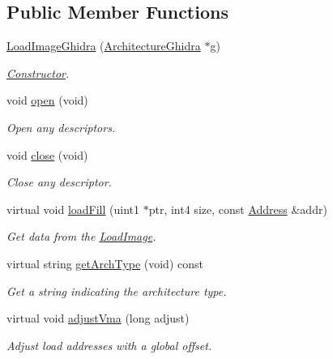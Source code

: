 \subsection*{Public Member Functions}
\begin{DoxyCompactItemize}
\item 
\mbox{\hyperlink{class_load_image_ghidra_aedafdb4dafc0b5cc60d1f3f28776e6a0}{Load\+Image\+Ghidra}} (\mbox{\hyperlink{class_architecture_ghidra}{Architecture\+Ghidra}} $\ast$g)
\begin{DoxyCompactList}\small\item\em \mbox{\hyperlink{class_constructor}{Constructor}}. \end{DoxyCompactList}\item 
void \mbox{\hyperlink{class_load_image_ghidra_a589c35797bcd4aca275a60b08ffb4a13}{open}} (void)
\begin{DoxyCompactList}\small\item\em Open any descriptors. \end{DoxyCompactList}\item 
void \mbox{\hyperlink{class_load_image_ghidra_acf4fe0d15e10fc48c52438810a1d7cdf}{close}} (void)
\begin{DoxyCompactList}\small\item\em Close any descriptor. \end{DoxyCompactList}\item 
virtual void \mbox{\hyperlink{class_load_image_ghidra_accc4b273390b6959e4552490fbb146c7}{load\+Fill}} (uint1 $\ast$ptr, int4 size, const \mbox{\hyperlink{class_address}{Address}} \&addr)
\begin{DoxyCompactList}\small\item\em Get data from the \mbox{\hyperlink{class_load_image}{Load\+Image}}. \end{DoxyCompactList}\item 
virtual string \mbox{\hyperlink{class_load_image_ghidra_aa7df1ff6995b047b625f104053f71e47}{get\+Arch\+Type}} (void) const
\begin{DoxyCompactList}\small\item\em Get a string indicating the architecture type. \end{DoxyCompactList}\item 
virtual void \mbox{\hyperlink{class_load_image_ghidra_a4abe9a4fba1ce99fe3f29ff1236f541e}{adjust\+Vma}} (long adjust)
\begin{DoxyCompactList}\small\item\em Adjust load addresses with a global offset. \end{DoxyCompactList}\end{DoxyCompactItemize}
